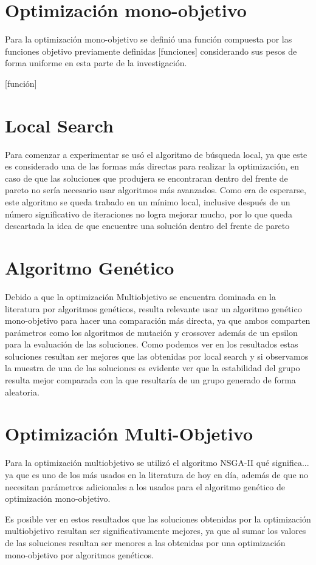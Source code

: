 \section{Optimización mono-objetivo}

Para la optimización mono-objetivo se definió una función compuesta por las funciones objetivo previamente definidas [funciones] considerando sus pesos de forma uniforme en esta parte de la investigación.

[función]

\section{Local Search}

Para comenzar a experimentar se usó el algoritmo de búsqueda local, ya que este es considerado una de las formas más directas para realizar la optimización, en caso de que las soluciones que produjera se encontraran dentro del frente de pareto no sería necesario usar algoritmos más avanzados. Como era de esperarse, este algoritmo se queda trabado en un mínimo local, inclusive después de un número significativo de iteraciones no logra mejorar mucho, por lo que queda descartada la idea de que encuentre una solución dentro del frente de pareto

\section{Algoritmo Genético}

Debido a que la optimización Multiobjetivo se encuentra dominada en la literatura por algoritmos genéticos, resulta relevante usar un algoritmo genético mono-objetivo para hacer una comparación más directa, ya que ambos comparten parámetros como los algoritmos de mutación y crossover además de un epsilon para la evaluación de las soluciones. Como podemos ver en los resultados estas soluciones resultan ser mejores que las obtenidas por local search y si observamos la muestra de una de las soluciones es evidente ver que la estabilidad del grupo resulta mejor comparada con la que resultaría de un grupo generado de forma aleatoria.

\section{Optimización Multi-Objetivo}

Para la optimización multiobjetivo se utilizó el algoritmo NSGA-II qué significa... ya que es uno de los más usados en la literatura de hoy en día, además de que no necesitan parámetros adicionales a los usados para el algoritmo genético de optimización mono-objetivo.

Es posible ver en estos resultados que las soluciones obtenidas por la optimización multiobjetivo resultan ser significativamente mejores, ya que al sumar los valores de las soluciones resultan ser menores a las obtenidas por una optimización mono-objetivo por algoritmos genéticos.
